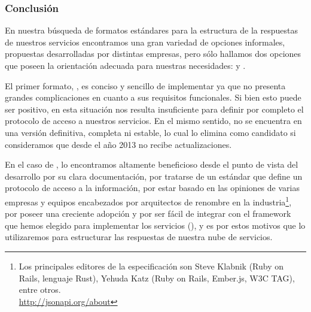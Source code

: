 \subsubsection{Conclusión}

En nuestra búsqueda de formatos estándares para la estructura de la respuestas de nuestros servicios encontramos una gran variedad de opciones informales, propuestas desarrolladas por distintas empresas, pero sólo hallamos dos opciones que poseen la orientación adecuada para nuestras necesidades:  y .

El primer formato, , es conciso y sencillo de implementar ya que no presenta grandes complicaciones en cuanto a sus requisitos funcionales. Si bien esto puede ser positivo, en esta situación nos resulta insuficiente para definir por completo el protocolo de acceso a nuestros servicios. En el mismo sentido,  no se encuentra en una versión definitiva, completa ni estable, lo cual lo elimina como candidato si consideramos que desde el año 2013 no recibe actualizaciones.

En el caso de , lo encontramos altamente beneficioso desde el punto de vista del desarrollo por su clara documentación, por tratarse de un estándar que define un protocolo de acceso a la información, por estar basado en las opiniones de varias empresas y equipos encabezados por arquitectos de renombre en la industria\footnote{Los principales editores de la especificación son Steve Klabnik (Ruby on Rails, lenguaje Rust), Yehuda Katz (Ruby on Rails, Ember.js, W3C TAG), entre otros.\\\url{http://jsonapi.org/about}}, por poseer una creciente adopción y por ser fácil de integrar con el framework que hemos elegido para implementar los servicios (), y es por estos motivos que lo utilizaremos para estructurar las respuestas de nuestra nube de servicios.
